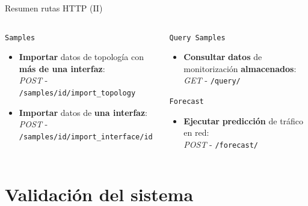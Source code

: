 \documentclass[aspectratio=169,xcolor=dvipsnames]{beamer}
\begin{document}
	\begin{frame}{Resumen rutas HTTP (II)}
		\begin{columns}
			\begin{column}{0.5\textwidth}
				\begin{exampleblock}{\texttt{Samples}}
					\begin{itemize}
						\item \textbf{Importar} datos de topología con \textbf{más de una interfaz}: \\ \textit{\small POST} - \texttt{\small /samples/id/import\_topology}
						
						\item \textbf{Importar} datos de \textbf{una interfaz}: \\ \textit{POST} - \texttt{\small /samples/id/import\_interface/id}
					\end{itemize}
				\end{exampleblock}
			\end{column}
		
			\begin{column}{0.5\textwidth}
				\begin{exampleblock}{\texttt{Query Samples}}
					\begin{itemize}
						\item \textbf{Consultar} \textbf{datos} de monitorización \textbf{almacenados}: \\ \textit{GET} - \texttt{\small /query/}
					\end{itemize}
				\end{exampleblock}
			
				\begin{exampleblock}{\texttt{Forecast}}
					\begin{itemize}
						\item \textbf{Ejecutar} \textbf{predicción} de tráfico en red: \\ \textit{POST} - \texttt{\small /forecast/}
					\end{itemize}
				\end{exampleblock}
			\end{column}
		\end{columns}
	\end{frame}
	
	
	\section{Validación del sistema}
	
\end{document}
